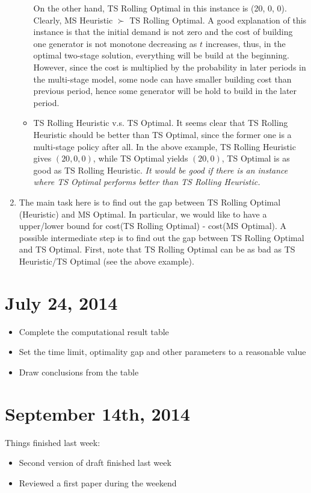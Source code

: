 \documentclass[10pt]{article}
\theoremstyle{plain}
\theoremstyle{definition}
\theoremstyle{remark}
\begin{document}
\begin{enumerate}[label=\emph{\alph*)}]
\begin{itemize}
On the other hand, TS Rolling Optimal in this instance is (20, 0, 0). Clearly, MS Heuristic $\succ$ TS Rolling Optimal.
A good explanation of this instance is that the initial demand is not zero and the cost of building one generator
is not monotone decreasing as $t$ increases, thus, in the optimal two-stage solution, everything will be build at the
beginning. However, since the cost is multiplied by the probability in later periods in the multi-stage model, some node
can have smaller building cost than previous period, hence some generator will be hold to build in the later period.
\item {\color{rred}TS Rolling Heuristic v.s. TS Optimal.}
It seems clear that TS Rolling Heuristic should be better than TS Optimal, since the former one is a multi-stage
policy after all. In the above example, TS Rolling Heuristic gives $(20, 0, 0)$, while TS Optimal yields $(20, 0)$,
TS Optimal is as good as TS Rolling Heuristic.
\emph{It would be good if there is an instance where TS Optimal performs
better than TS Rolling Heuristic.}
\end{itemize}
\item The main task here is to find out the gap between TS Rolling Optimal (Heuristic) and MS Optimal.
{\color{rred}In particular, we would like to have a upper/lower bound for cost(TS Rolling Optimal) - cost(MS Optimal).}
A possible intermediate step is to find out the gap between TS Rolling Optimal and TS Optimal.
First, note that TS Rolling Optimal can be as bad as TS Heuristic/TS Optimal (see the above example).
\end{enumerate}

\section*{July 24, 2014}
\begin{itemize}[itemsep=0ex,topsep=0ex]
\item Complete the computational result table
\item Set the time limit, optimality gap and other parameters to a reasonable value
\item Draw conclusions from the table
\end{itemize}

\section*{September 14th, 2014}
Things finished last week:
\begin{itemize}[itemsep=0ex,topsep=0ex]
\item Second version of draft finished last week
\item Reviewed a first paper during the weekend
\end{itemize}
\end{document}
